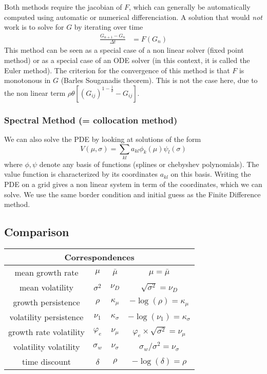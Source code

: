 \documentclass[english]{article}
\begin{document}
Both methods require the jacobian of $F$, which can generally be automatically computed using automatic or numerical differenciation. 
A solution that would \textit{not} work is to solve for $G$ by iterating over time
\begin{align*}
	\frac{G_{n+1}-G_n}{\Delta t} &= F(G_n)
\end{align*}
This method can be seen as a special case of a non linear solver (fixed point method) or as a special case of an ODE solver (in this context, it is called the Euler method). The criterion for the convergence of this method is that $F$ is monotonous in $G$ (Barles Souganadis theorem). This is not the case here, due to the non linear term  $\rho \theta[(G_{ij})^{1-\frac{1}{\theta}}- G_{ij}]$.

\subsubsection{Spectral Method (= collocation method)}
We can also solve the PDE by looking at solutions of the form
$$V(\mu, \sigma) = \sum_{kl} a_{kl} \phi_k(\mu)\psi_l(\sigma)$$
where $\phi, \psi$ denote any basis of functions (splines or chebyshev polynomials).
The value function is characterized by its coordinates $a_{kl}$ on this basis. Writing the PDE on a grid gives a non linear system in term of the coordinates, which we can solve. We use the same border condition and initial guess as the Finite Difference method.

\subsection{Comparison}

\begin{tabular}{|c|c|c|c|}
	\hline 
	\multicolumn{4}{|c|}{Correspondences}
	\\
	\hline 
	\hline 
	mean growth rate & $\mu$ & $\bar{\mu}$ & $\mu=\bar{\mu}$
	\\
	\hline 
	mean volatility & $\sigma^{2}$ & $\nu_{D}$ & $\sqrt{\sigma^{2}}=\nu_{D}$
	\\
	\hline 
	growth persistence & $\rho$ & $\kappa_{\mu}$ & $ - \log(\rho) = \kappa_\mu$ 
	\\
	\hline 
	volatility persistence & $\nu_{1}$ & $\kappa_{\sigma}$ & $-\log\left(\nu_{1}\right)=\kappa_{\sigma}$
	\\
	\hline 
	growth rate volatility & $\varphi_{e}$ & $\nu_{\mu}$ & $\varphi_{e}\times\sqrt{\sigma^{2}}=\nu_{\mu}$
	\\
	\hline 
	volatility volatility & $\sigma_{w}$ & $\nu_{\sigma}$ & $\sigma_{w}/\sigma^{2}=\nu_{\sigma}$
	\\
	\hline 
	time discount & $\delta$ & $\rho$ & $-\log\left(\delta\right)=\rho$\\
	\hline
\end{tabular}
\end{document}
